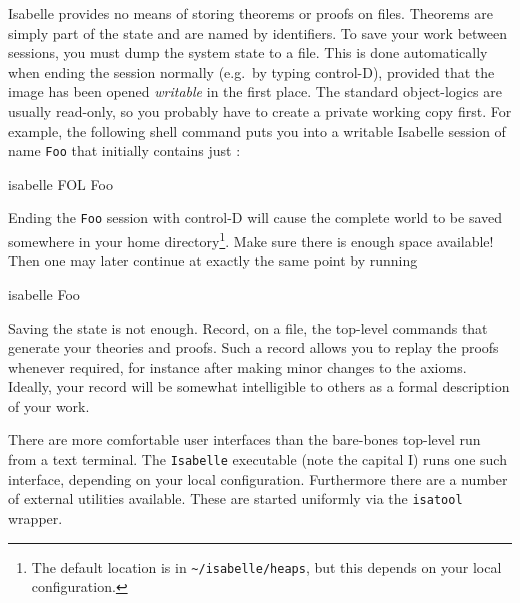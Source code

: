  Isabelle provides no means of storing
theorems or proofs on files.  Theorems are simply part of the \ML{}
state and are named by \ML{} identifiers.  To save your work between
sessions, you must dump the \ML{} system state to a file. This is done
automatically when ending the session normally (e.g.\ by typing
control-D), provided that the image has been opened \emph{writable} in
the first place. The standard object-logics are usually read-only, so
you probably have to create a private working copy first. For example,
the following shell command puts you into a writable Isabelle session
of name \texttt{Foo} that initially contains just \FOL:
\begin{ttbox}
isabelle FOL Foo
\end{ttbox}
Ending the \texttt{Foo} session with control-D will cause the complete
\ML{} world to be saved somewhere in your home directory\footnote{The
  default location is in \texttt{\~\relax/isabelle/heaps}, but this
  depends on your local configuration.}. Make sure there is enough
space available! Then one may later continue at exactly the same point
by running
\begin{ttbox}
isabelle Foo  
\end{ttbox}


\medskip Saving the state is not enough.  Record, on a file, the
top-level commands that generate your theories and proofs.  Such a
record allows you to replay the proofs whenever required, for instance
after making minor changes to the axioms.  Ideally, your record will
be somewhat intelligible to others as a formal description of your
work.

\medskip There are more comfortable user interfaces than the
bare-bones \ML{} top-level run from a text terminal. The
\texttt{Isabelle} executable (note the capital I) runs one such
interface, depending on your local configuration.  Furthermore there
are a number of external utilities available. These are started
uniformly via the \texttt{isatool} wrapper.



